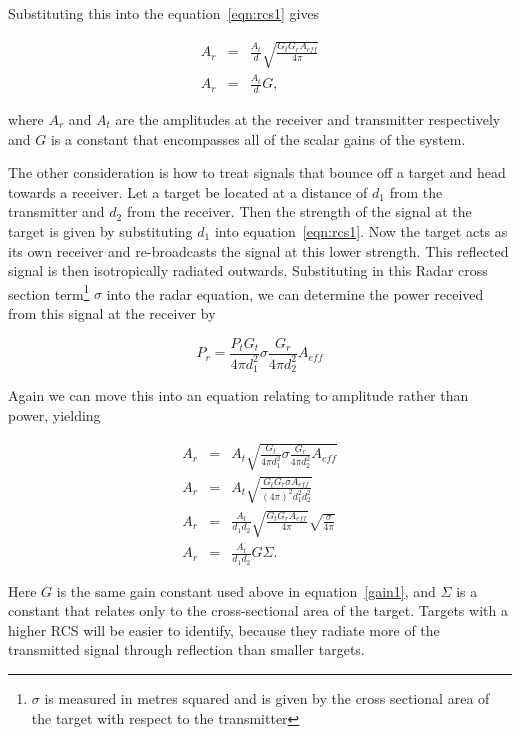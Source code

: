 \documentclass[12pt,openany,a4paper]{book}
\begin{document}
\bigskip

Substituting this into the equation~\ref{eqn:rcs1} gives

\begin{eqnarray}
A_r &=& \frac{A_t}{d} \sqrt{\frac{G_tG_rA_{eff}}{4\pi}} \\
\label{gain1}
A_r &=& \frac{A_t}{d} G,
\end{eqnarray}

\bigskip

where $A_r$ and $A_t$ are the amplitudes at the receiver and transmitter respectively and $G$ is a constant that encompasses all of the scalar gains of the system.

\bigskip

The other consideration is how to treat signals that bounce off a target and head towards a receiver. Let a target be located at a distance of $d_1$ from the transmitter and $d_2$ from the receiver. Then the strength of the signal at the target is given by substituting $d_1$ into equation~\ref{eqn:rcs1}. Now the target acts as its own receiver and re-broadcasts the signal at this lower strength. This reflected signal is then isotropically radiated outwards. Substituting in this Radar cross section term\footnote{$\sigma$ is measured in metres squared and is given by the cross sectional area of the target with respect to the transmitter} $\sigma$ into the radar equation, we can determine the power received from this signal at the receiver by

\begin{equation}
\label{eqn:rcs2}
P_r = \frac{P_tG_t}{4\pi d_1^2} \sigma \frac{G_r}{4\pi d_2^2}A_{eff}
\end{equation}

\bigskip

Again we can move this into an equation relating to amplitude rather than power, yielding

\begin{eqnarray}
A_r &=& A_t \sqrt{\frac{G_t}{4\pi d_1^2} \sigma \frac{G_r}{4\pi d_2^2}A_{eff}} \\
A_r &=& A_t \sqrt{\frac{G_tG_r\sigma A_{eff}}{(4\pi)^2d_1^2d_2^2}} \\
A_r &=& \frac{A_t}{d_1d_2} \sqrt{\frac{G_tG_r A_{eff}}{4\pi}} \sqrt{\frac{\sigma}{4\pi}} \\
\label{eqn:add}
A_r &=& \frac{A_t}{d_1d_2} G \Sigma.
\end{eqnarray}

\bigskip

Here $G$ is the same gain constant used above in equation~\ref{gain1}, and $\Sigma$ is a constant that relates only to the cross-sectional area of the target. Targets with a higher RCS will be easier to identify, because they radiate more of the transmitted signal through reflection than smaller targets.
\end{document}
